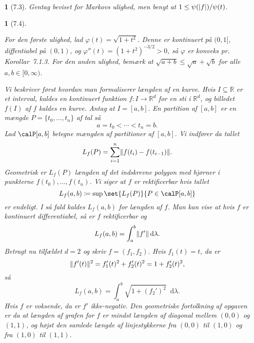 \documentclass[a4paper, 11pt, article, danish, oneside]{memoir}
\newcommand{\reals}{\mathbb{R}}
\newcommand{\blank}{\mathrel{\;\cdot\;}}
\newcommand{\blankifempty}[1]{\ifstrempty{#1}{\blank}{#1}}
\DeclarePairedDelimiter{\auxdelimlvert}{\lvert}{\rvert}
\DeclarePairedDelimiter{\auxdelimlVert}{\lVert}{\rVert}
\newcommand{\abs}[2][]{\auxdelimlvert[#1]{\blankifempty{#2}}}
\newcommand{\norm}[1]{\auxdelimlVert{\blankifempty{#1}}}
\newcommand{\dif}{\mathop{}\!\mathrm{d}}
\newcommand{\defeq}{\coloneqq}
\renewcommand{\phi}{\varphi}
\newcommand{\pencilsymbol}{\raisebox{-2pt}{\normalfont\PencilLeft}}
\theoremstyle{changedotcustomnumber}
\newtheorem{opgave}{\pencilsymbol}
\theoremstyle{changedotbreakcustomnumber}
\newtheorem{opgavebreak}{\pencilsymbol}
\begin{document}
\begin{opgave}[7.3]
    Gentag beviset for Markovs ulighed, men benyt at $1 \leq \psi(\abs{f}) / \psi(t)$.
\end{opgave}


\begin{opgavebreak}[7.4]
\begin{solutionsec}
    \item For den første ulighed, lad $\phi(t) = \sqrt{1 + t^2}$. Denne er kontinuert på $(0,1]$, diffentiabel på $(0,1)$, og $\phi''(t) = (1+t^2)^{-3/2} > 0$, så $\phi$ er konveks pr. Korollar~7.1.3. For den anden ulighed, bemærk at $\sqrt{a+b} \leq \sqrt{a} + \sqrt{b}$ for alle $a,b \in [0,\infty)$.

    \item Vi beskriver først hvordan man formaliserer længden af en kurve. Hvis $I \subseteq \reals$ er et interval, kaldes en kontinuert funktion $f \colon I \to \reals^d$ for en \emph{sti} i $\reals^d$, og billedet $f(I)$ af $f$ kaldes en \emph{kurve}. Antag at $I = [a,b]$. En \emph{partition} af $[a,b]$ er en mængde $P = \{t_0, \ldots, t_n\}$ af tal så
    \begin{equation*}
        a
            = t_0
            < \cdots
            < t_n
            = b.
    \end{equation*}
    Lad $\calP[a,b]$ betegne mængden af partitioner af $[a,b]$. Vi indfører da tallet
    \begin{equation*}
        L_f(P)
            = \sum_{i=1}^n \norm{f(t_i) - f(t_{i-1})}.
    \end{equation*}
    Geometrisk er $L_f(P)$ længden af det indskrevne polygon med hjørner i punkterne $f(t_0), \ldots, f(t_n)$. Vi siger at $f$ er \emph{rektificerbar} hvis tallet
    \begin{equation*}
        L_f(a,b)
            \defeq \sup \set{L_f(P)}{P \in \calP[a,b]}
    \end{equation*}
    er endeligt. I så fald kaldes $L_f(a,b)$ for \emph{længden} af $f$. Man kan vise at hvis $f$ er kontinuert differentiabel, så er $f$ rektificerbar og
    \begin{equation*}
        L_f(a,b)
            = \int_a^b \norm{f'} \dif\lambda.
    \end{equation*}
    Betragt nu tilfældet $d = 2$ og skriv $f = (f_1, f_2)$. Hvis $f_1(t) = t$, da er
    \begin{equation*}
        \norm{f'(t)}^2
            = f_1'(t)^2 + f_2'(t)^2
            = 1 + f_2'(t)^2,
    \end{equation*}
    så
    \begin{equation*}
        L_f(a,b)
            = \int_a^b \sqrt{1 + (f_2')^2} \dif\lambda.
    \end{equation*}
    Hvis $f$ er voksende, da er $f'$ ikke-negativ. Den geometriske fortolkning af opgaven er da at længden af grafen for $f$ er mindst længden af diagonal mellem $(0,0)$ og $(1,1)$, og højst den samlede længde af linjestykkerne fra $(0,0)$ til $(1,0)$ og fra $(1,0)$ til $(1,1)$.
\end{solutionsec}
\end{opgavebreak}
\end{document}
